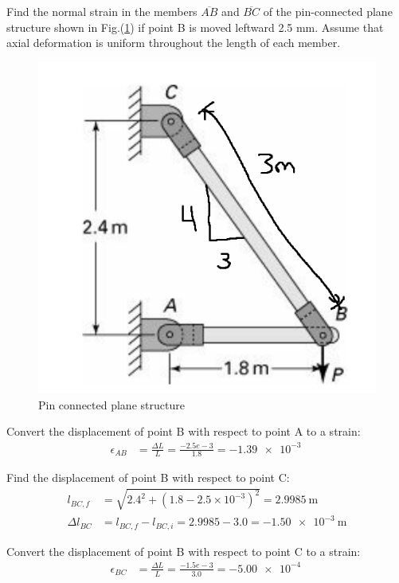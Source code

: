 \section{}
Find the normal strain in the members $\overline{AB}$ and $\overline{BC}$ of the pin-connected plane structure shown in
Fig.(\ref{fig:q6problem}) if point B is moved leftward 2.5 mm. Assume that axial deformation is uniform throughout
the length of each member.


\begin{figure}[h]
    \centering
    \includegraphics[width=0.3\linewidth]{Questions/Figures/Q6ProblemDiagram.png}
    \caption{Pin connected plane structure}
    \label{fig:q6problem}
\end{figure}

Convert the displacement of point B with respect to point A to a strain:
\begin{align*}
    \epsilon_{AB} &= \frac{\Delta L}{L} = \frac{-2.5 e-3}{1.8} = \boxed{\qty{-1.39e-3}{}}
\end{align*}

Find the displacement of point B with respect to point C:
\begin{align*}
    l_{BC, f} &= \sqrt{2.4^2 + (1.8 - 2.5\times 10^{-3})^2} = \qty{2.9985}{\meter} \\
    \Delta l_{BC} &= l_{BC, f} - l_{BC, i} = 2.9985 - 3.0 = \qty{-1.50 e-3}{\meter}
\end{align*}

Convert the displacement of point B with respect to point C to a strain:
\begin{align*}
    \epsilon_{BC} &= \frac{\Delta L}{L} = \frac{-1.5 e-3}{3.0} = \boxed{\qty{-5.00e-4}{}}
\end{align*}

  